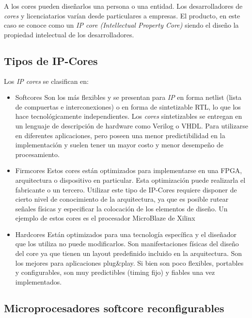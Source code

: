 A los cores pueden diseñarlos una persona o una entidad. Los
desarrolladores de \textit{cores} y licenciatarios varían desde
particulares a empresas. El producto, en este caso se conoce como un
\textit{IP core (Intellectual Property Core)} siendo el diseño la
propiedad intelectual de los desarrolladores.
	
\subsection{Tipos de IP-Cores}

Los \textit{IP cores} se clasifican en:

\begin{itemize}
\item{Softcores} Son los más flexibles y se presentan para \textit{IP}
  en forma netlist (lista de compuertas e interconexiones) o en forma
  de sintetizable RTL, lo que los hace tecnológicamente
  independientes. Los \textit{cores} sintetizables se entregan en un
  lenguaje de descripción de hardware como Verilog o VHDL. Para utilizarse en diferentes aplicaciones, pero poseen una menor
  predictibilidad en la implementación y suelen tener un mayor costo y
  menor desempeño de procesamiento.

\item{Firmcores} Estos cores están optimizados para
  implementarse en una FPGA, arquitectura o dispositivo en
  particular. Esta optimización puede realizarla el fabricante
  o un tercero. Utilizar este tipo de IP-Cores requiere disponer
  de cierto nivel de conocimiento de la arquitectura, ya que es
  posible rutear señales físicas y especificar la colocación de los
  elementos de diseño. Un ejemplo de estos cores es el procesador
  MicroBlaze de Xilinx~\cite{Etiqueta04}

\item{Hardcores} Están optimizados para una tecnología específica y el diseñador que los utiliza no puede modificarlos. Son
  manifestaciones físicas del diseño del core ya que tienen un layout
  predefinido incluido en la arquitectura. Son los mejores para
  aplicaciones plug\&play. Si bien son poco flexibles, portables y
  configurables, son muy predictibles (timing fijo) y fiables
  una vez implementados.
\end{itemize}

\subsection{Microprocesadores softcore reconfigurables}

